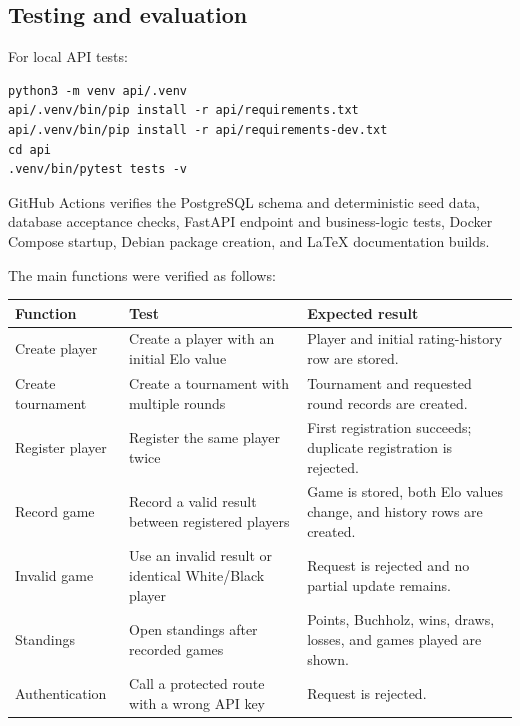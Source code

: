 \documentclass[11pt,a4paper]{article}
\begin{document}
\subsection{Testing and evaluation}

For local API tests:

\begin{verbatim}
python3 -m venv api/.venv
api/.venv/bin/pip install -r api/requirements.txt
api/.venv/bin/pip install -r api/requirements-dev.txt
cd api
.venv/bin/pytest tests -v
\end{verbatim}

GitHub Actions verifies the PostgreSQL schema and deterministic seed data,
database acceptance checks, FastAPI endpoint and business-logic tests, Docker
Compose startup, Debian package creation, and LaTeX documentation builds.

The main functions were verified as follows:

\begin{center}
\begin{tabular}{>{\raggedright\arraybackslash}p{3.0cm}
                >{\raggedright\arraybackslash}p{4.7cm}
                >{\raggedright\arraybackslash}p{5.0cm}}
\toprule
\textbf{Function} & \textbf{Test} & \textbf{Expected result} \\
\midrule
Create player &
Create a player with an initial Elo value &
Player and initial rating-history row are stored. \\

Create tournament &
Create a tournament with multiple rounds &
Tournament and requested round records are created. \\

Register player &
Register the same player twice &
First registration succeeds; duplicate registration is rejected. \\

Record game &
Record a valid result between registered players &
Game is stored, both Elo values change, and history rows are created. \\

Invalid game &
Use an invalid result or identical White/Black player &
Request is rejected and no partial update remains. \\

Standings &
Open standings after recorded games &
Points, Buchholz, wins, draws, losses, and games played are shown. \\

Authentication &
Call a protected route with a wrong API key &
Request is rejected. \\
\bottomrule
\end{tabular}
\end{center}
\end{document}
